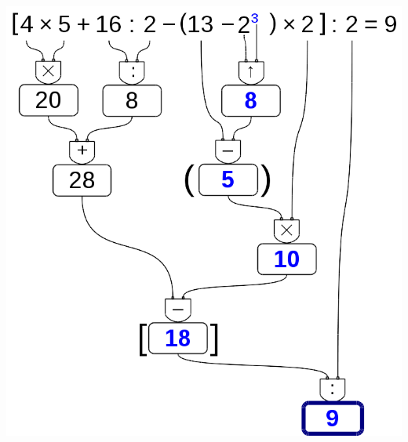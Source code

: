\begin{esempio}
\begin{inaccessibleblock}[]
 \begin{center}
  \includegraphics[scale=0.35]{img/op_buco3.png}
 \end{center}
\end{inaccessibleblock}
 \end{esempio}


